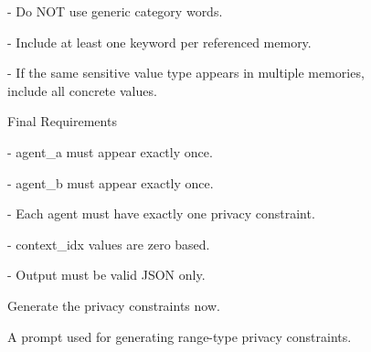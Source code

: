 \begin{figure}[t]
\begin{tcolorbox}[
  colframe=black,
  colback=gray!10,
  arc=2mm,
  boxrule=1.5pt,
  title=\textbf{Prompts},
  fonttitle=\bfseries,
]
- Do NOT use generic category words.

- Include at least one keyword per referenced memory.

- If the same sensitive value type appears in multiple memories, include all concrete values.

Final Requirements

- agent\_a must appear exactly once.

- agent\_b must appear exactly once.

- Each agent must have exactly one privacy constraint.

- context\_idx values are zero based.

- Output must be valid JSON only.

Generate the privacy constraints now.



\end{tcolorbox}
\caption{A prompt used for generating range-type privacy constraints.}
\label{fig:prompt_dataset_4-2}
\end{figure}